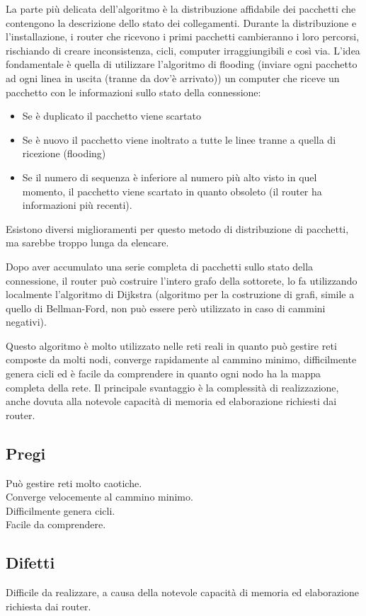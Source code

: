 La parte più delicata dell'algoritmo è la distribuzione affidabile dei pacchetti che contengono la descrizione dello stato dei collegamenti. Durante la distribuzione e l'installazione, i router che ricevono i primi pacchetti cambieranno i loro percorsi, rischiando di creare inconsistenza, cicli, computer irraggiungibili e così via. L'idea fondamentale è quella di utilizzare l'algoritmo di flooding (inviare ogni pacchetto ad ogni linea in uscita (tranne da dov'è arrivato)) un computer che riceve un pacchetto con le informazioni sullo stato della connessione:
\begin{itemize}
\item	Se è duplicato il pacchetto viene scartato
\item	Se è nuovo il pacchetto viene inoltrato a tutte le linee tranne a quella di ricezione (flooding)
\item	Se il numero di sequenza è inferiore al numero più alto visto in quel momento, il pacchetto viene scartato in quanto obsoleto (il router ha informazioni più recenti).
\end{itemize}
Esistono diversi miglioramenti per questo metodo di distribuzione di pacchetti, ma sarebbe troppo lunga da elencare.

Dopo aver accumulato una serie completa di pacchetti sullo stato della connessione, il router può costruire l'intero grafo della sottorete, lo fa utilizzando localmente l'algoritmo di Dijkstra (algoritmo per la costruzione di grafi, simile a quello di Bellman-Ford, non può essere però utilizzato in caso di cammini negativi).

Questo algoritmo è molto utilizzato nelle reti reali in quanto può gestire reti composte da molti nodi, converge rapidamente al cammino minimo, difficilmente genera cicli ed è facile da comprendere in quanto ogni nodo ha la mappa completa della rete. Il principale svantaggio è la complessità di realizzazione, anche dovuta alla notevole capacità di memoria ed elaborazione richiesti dai router.

\subsection{Pregi}
Può gestire reti molto caotiche.\\
Converge velocemente al cammino minimo.\\
Difficilmente genera cicli.\\
Facile da comprendere.

\subsection{Difetti}
Difficile da realizzare, a causa della notevole capacità di memoria ed elaborazione richiesta dai router.

